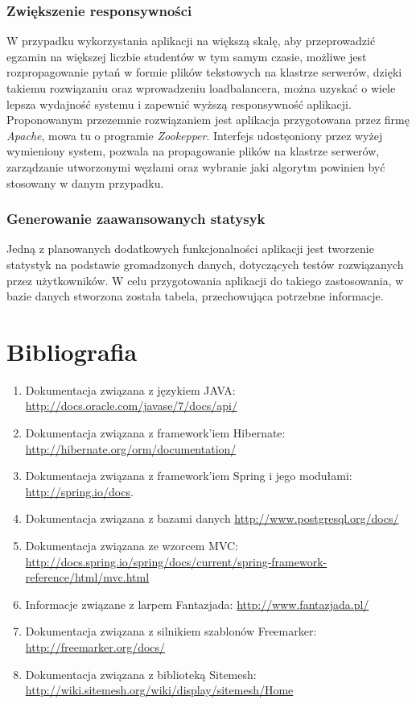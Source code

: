\documentclass[a4paper, titlepage]{article}
\begin{document}
\subsubsection{Zwiększenie responsywności}
            W przypadku wykorzystania aplikacji na większą skalę, aby przeprowadzić egzamin na większej liczbie studentów w tym samym czasie, możliwe jest rozpropagowanie pytań w formie plików tekstowych na klastrze serwerów, dzięki takiemu rozwiązaniu oraz wprowadzeniu loadbalancera, można uzyskać o wiele lepsza wydajność systemu i zapewnić wyższą responsywność aplikacji. Proponowanym przezemnie rozwiązaniem jest aplikacja przygotowana przez firmę \textit{Apache}, mowa tu o programie \textit{Zookepper}. Interfejs udostęoniony przez wyżej wymieniony system, pozwala na propagowanie plików na klastrze serwerów, zarządzanie utworzonymi węzłami oraz wybranie jaki algorytm powinien być stosowany w danym przypadku.
           
           \subsubsection{Generowanie zaawansowanych statysyk} 
            Jedną z planowanych dodatkowych funkcjonalności aplikacji jest tworzenie statystyk na podstawie gromadzonych danych, dotyczących testów rozwiązanych przez użytkowników. W celu przygotowania aplikacji do takiego zastosowania, w bazie danych stworzona została tabela, przechowująca potrzebne informacje. 


\newpage
\section{Bibliografia}
\begin{enumerate}
\item Dokumentacja związana z językiem JAVA: \url{http://docs.oracle.com/javase/7/docs/api/}
\item Dokumentacja związana z framework'iem Hibernate: \url{http://hibernate.org/orm/documentation/}
\item Dokumentacja związana z framework'iem Spring i jego modułami: \url{http://spring.io/docs}.
\item Dokumentacja związana z bazami danych \url{http://www.postgresql.org/docs/}
\item Dokumentacja związana ze wzorcem MVC: \url{http://docs.spring.io/spring/docs/current/spring-framework-reference/html/mvc.html}
\item Informacje związane z larpem Fantazjada: \url{http://www.fantazjada.pl/}
\item Dokumentacja związana z silnikiem szablonów Freemarker: \url{http://freemarker.org/docs/}
\item Dokumentacja związana z biblioteką Sitemesh: \url{http://wiki.sitemesh.org/wiki/display/sitemesh/Home}
\end{enumerate}


\newpage
\listoffigures
\end{document}
